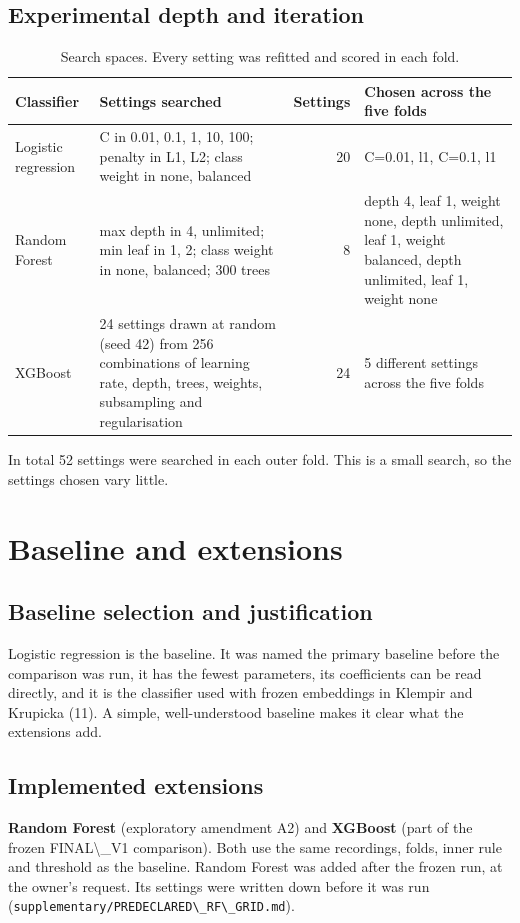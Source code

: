 \documentclass[11pt,a4paper]{article}
\begin{document}
\subsection{Experimental depth and iteration}\label{sec:depth}
\begin{table}[H]\centering\footnotesize\renewcommand{\arraystretch}{1.15}
\caption{Search spaces. Every setting was refitted and scored in each fold.}
\begin{tabular}{llrp{5cm}}
\toprule
\textbf{Classifier} & \textbf{Settings searched} & \textbf{Settings} & \textbf{Chosen across the five folds}\\
\midrule
Logistic regression & C in {0.01, 0.1, 1, 10, 100}; penalty in {L1, L2}; class weight in {none, balanced} & 20 & C=0.01, l1, C=0.1, l1\\
Random Forest & max depth in {4, unlimited}; min leaf in {1, 2}; class weight in {none, balanced}; 300 trees & 8 & depth 4, leaf 1, weight none, depth unlimited, leaf 1, weight balanced, depth unlimited, leaf 1, weight none\\
XGBoost & 24 settings drawn at random (seed 42) from 256 combinations of learning rate, depth, trees, weights, subsampling and regularisation & 24 & 5 different settings across the five folds\\
\bottomrule
\end{tabular}\end{table}
In total 52 settings were searched in each outer fold. This is a small search, so the settings chosen vary little.

\section{Baseline and extensions}\label{sec:baseline}
\subsection{Baseline selection and justification}\label{sec:baselineselect}
Logistic regression is the baseline. It was named the primary baseline before the comparison was run, it has the fewest parameters, its coefficients can be read directly, and it is the classifier used with frozen embeddings in Klempir and Krupicka (11). A simple, well-understood baseline makes it clear what the extensions add.

\subsection{Implemented extensions}\label{sec:extensions}
\textbf{Random Forest} (exploratory amendment A2) and \textbf{XGBoost} (part of the frozen FINAL\textbackslash{}\_V1 comparison). Both use the same recordings, folds, inner rule and threshold as the baseline. Random Forest was added after the frozen run, at the owner's request. Its settings were written down before it was run (\texttt{supplementary/PREDECLARED\textbackslash{}\_\allowbreak{}RF\textbackslash{}\_\allowbreak{}GRID.md}).
\end{document}
